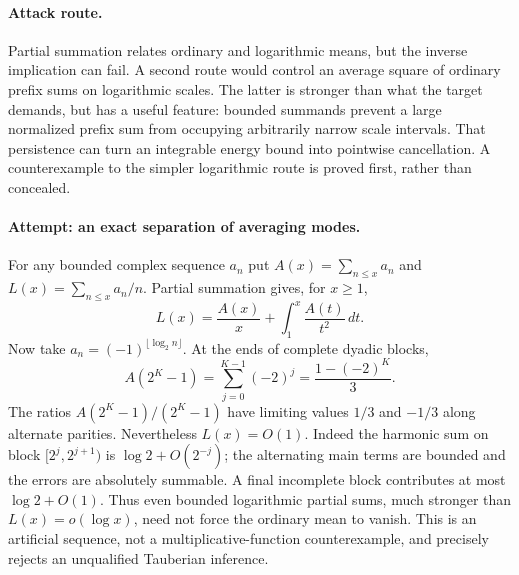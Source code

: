 \documentclass[11pt,a4paper]{article}
\numberwithin{equation}{section}
\begin{document}
\paragraph{Attack route.}
Partial summation relates ordinary and logarithmic means, but the inverse
implication can fail. A second route would control an average square of
ordinary prefix sums on logarithmic scales. The latter is stronger than
what the target demands, but has a useful feature: bounded summands prevent
a large normalized prefix sum from occupying arbitrarily narrow scale
intervals. That persistence can turn an integrable energy bound into
pointwise cancellation. A counterexample to the simpler logarithmic route
is proved first, rather than concealed.

\paragraph{Attempt: an exact separation of averaging modes.}
For any bounded complex sequence $a_n$ put
$A(x)=\sum_{n\leq x}a_n$ and $L(x)=\sum_{n\leq x}a_n/n$.
Partial summation gives, for $x\geq1$,
\begin{equation}\label{eq77:abel}
 L(x)=\frac{A(x)}x+\int_1^x\frac{A(t)}{t^2}\,dt.
\end{equation}
Now take $a_n=(-1)^{\lfloor\log_2n\rfloor}$.
At the ends of complete dyadic blocks,
\begin{equation}\label{eq77:counter}
 A(2^K-1)=\sum_{j=0}^{K-1}(-2)^j
           =\frac{1-(-2)^K}{3}.
\end{equation}
The ratios $A(2^K-1)/(2^K-1)$ have limiting values $1/3$ and $-1/3$
along alternate parities. Nevertheless $L(x)=O(1)$.
Indeed the harmonic sum on block $[2^j,2^{j+1})$ is
$\log2+O(2^{-j})$; the alternating main terms are bounded and the errors
are absolutely summable. A final incomplete block contributes at most
$\log2+O(1)$. Thus even bounded logarithmic partial sums, much stronger
than $L(x)=o(\log x)$, need not force the ordinary mean to vanish.
This is an artificial sequence, not a multiplicative-function
counterexample, and precisely rejects an unqualified Tauberian inference.
\end{document}
